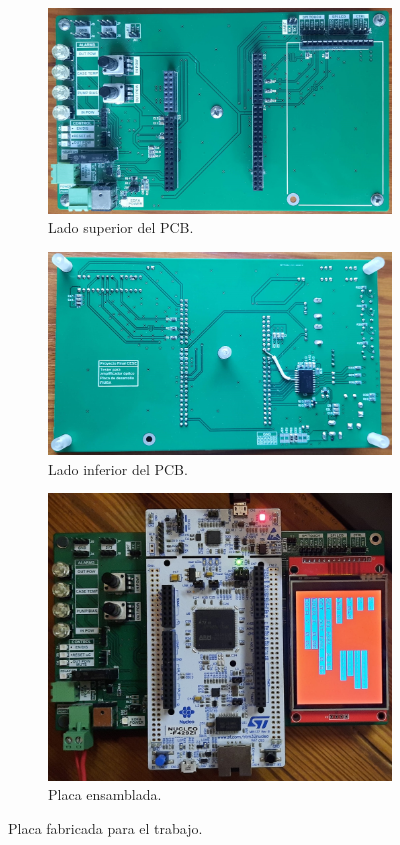 \begin{figure}[H]
     \centering
     \begin{subfigure}{\textwidth}
         \centering
         \includegraphics[width=.65\textwidth]{./Figures/placa2.jpg}
         \caption{Lado superior del PCB.}
         \label{fig:placa1}
     \end{subfigure}
     \begin{subfigure}{\textwidth}
         \centering
         \includegraphics[width=.65\textwidth]{./Figures/placa3.jpg}
         \caption{Lado inferior del PCB.}
         \label{fig:placa2}
     \end{subfigure}
     \begin{subfigure}{\textwidth}
         \centering
         \includegraphics[width=.65\textwidth]{./Figures/placa1.jpg}
         \caption{Placa ensamblada.}
         \label{fig:placa3}
     \end{subfigure}
        \caption{Placa fabricada para el trabajo.}
        \label{fig:three graphs}
\end{figure}

